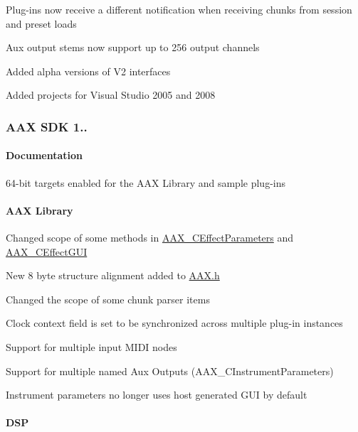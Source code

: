 \begin{DoxyItemize}
\item Plug-\/ins now receive a different notification when receiving chunks from session and preset loads 
\item Aux output stems now support up to 256 output channels 
\item Added alpha versions of V2 interfaces 
\item Added projects for Visual Studio 2005 and 2008 
\end{DoxyItemize}\hypertarget{a00375_aax_sdk_1p0p6}{}\subsubsection{A\+A\+X S\+D\+K 1..}\label{a00375_aax_sdk_1p0p6}
\hypertarget{a00375_aax_sdk_1p0p6_Documentation}{}\paragraph{Documentation}\label{a00375_aax_sdk_1p0p6_Documentation}

\begin{DoxyItemize}
\item 64-\/bit targets enabled for the A\+A\+X Library and sample plug-\/ins 
\end{DoxyItemize}\hypertarget{a00375_aax_sdk_1p0p6_AAXLibrary}{}\paragraph{A\+A\+X Library}\label{a00375_aax_sdk_1p0p6_AAXLibrary}

\begin{DoxyItemize}
\item Changed scope of some methods in \hyperlink{a00018}{A\+A\+X\+\_\+\+C\+Effect\+Parameters} and \hyperlink{a00017}{A\+A\+X\+\_\+\+C\+Effect\+G\+U\+I} 
\item New 8 byte structure alignment added to \hyperlink{a00149}{A\+A\+X.\+h} 
\item Changed the scope of some chunk parser items 
\item Clock context field is set to be synchronized across multiple plug-\/in instances 
\item Support for multiple input M\+I\+D\+I nodes 
\item Support for multiple named Aux Outputs (A\+A\+X\+\_\+\+C\+Instrument\+Parameters) 
\item Instrument parameters no longer uses host generated G\+U\+I by default 
\end{DoxyItemize}\hypertarget{a00375_aax_sdk_1p0p6_DSP}{}\paragraph{D\+S\+P}\label{a00375_aax_sdk_1p0p6_DSP}

